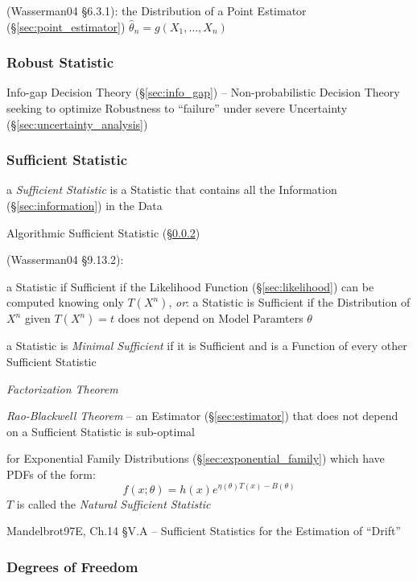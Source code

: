 (Wasserman04 \S6.3.1):
the Distribution of a Point Estimator (\S\ref{sec:point_estimator})
$\hat{\theta}_n = g(X_1,\ldots,X_n)$



\subsubsection{Robust Statistic}\label{sec:robust_statistic}

\fist Info-gap Decision Theory (\S\ref{sec:info_gap}) -- Non-probabilistic
Decision Theory seeking to optimize Robustness to ``failure'' under severe
Uncertainty (\S\ref{sec:uncertainty_analysis})



\subsubsection{Sufficient Statistic}\label{sec:sufficient_statistic}

a \emph{Sufficient Statistic} is a Statistic that contains all the
Information (\S\ref{sec:information}) in the Data

\fist Algorithmic Sufficient Statistic (\S\ref{sec:sufficient_statistic})

(Wasserman04 \S9.13.2):

a Statistic if Sufficient if the Likelihood Function (\S\ref{sec:likelihood})
can be computed knowing only $T(X^n)$,
\emph{or}: a Statistic is Sufficient if the Distribution of $X^n$ given
$T(X^n) = t$ does not depend on Model Paramters $\theta$

a Statistic is \emph{Minimal Sufficient} if it is Sufficient and is a Function
of every other Sufficient Statistic

\emph{Factorization Theorem}

\emph{Rao-Blackwell Theorem} -- an Estimator (\S\ref{sec:estimator}) that does
not depend on a Sufficient Statistic is sub-optimal

for Exponential Family Distributions (\S\ref{sec:exponential_family}) which have
PDFs of the form:
\[
  f(x; \theta) = h(x) e^{\eta(\theta)T(x) - B(\theta)}
\]
$T$ is called the \emph{Natural Sufficient Statistic}

Mandelbrot97E, Ch.14 \S V.A -- Sufficient Statistics for the Estimation of
``Drift''



\subsubsection{Degrees of Freedom}\label{sec:statistical_freedom}

